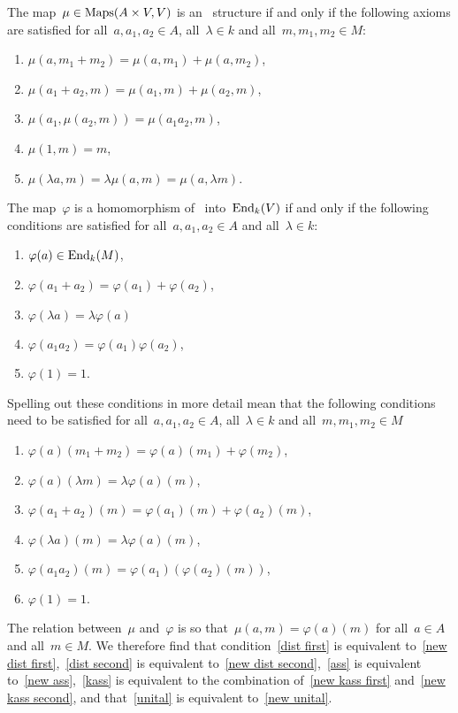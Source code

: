 The map~$\mu \in \operatorname{Maps}(A \times V, V)$ is an~{\Amod} structure if and only if the following axioms are satisfied for all~$a, a_1, a_2 \in A$, all~$\lambda \in k$ and all~$m, m_1, m_2 \in M$:
\begin{enumerate}[label=(MS\arabic*)]
  \item
    \label{dist second}
    $\mu(a,m_1 + m_2) = \mu(a,m_1) + \mu(a,m_2)$,
  \item
    \label{dist first}
    $\mu(a_1 + a_2,m) = \mu(a_1,m) + \mu(a_2,m)$,
  \item
    \label{ass}
    $\mu(a_1, \mu(a_2, m)) = \mu(a_1 a_2, m)$,
  \item
    \label{unital}
    $\mu(1,m) = m$,
  \item
    \label{kass}
    $\mu(\lambda a, m) = \lambda \mu(a,m) = \mu(a,\lambda m)$.
\end{enumerate}
The map~$\varphi$ is a homomorphism of~{\kalg} into~$\operatorname{End}_k(V)$ if and only if the following conditions are satisfied for all~$a, a_1, a_2 \in A$ and all~$\lambda \in k$:
\begin{enumerate}[label=(AH\arabic*)]
  \item
    $\varphi(a) \in \operatorname{End}_k(M)$,
  \item
    $\varphi(a_1 + a_2) = \varphi(a_1) + \varphi(a_2)$,
  \item
    $\varphi(\lambda a) = \lambda \varphi(a)$
  \item
    $\varphi(a_1 a_2) = \varphi(a_1) \varphi(a_2)$,
  \item
    $\varphi(1) = 1$.
\end{enumerate}
Spelling out these conditions in more detail mean that the following conditions need to be satisfied for all~$a, a_1, a_2 \in A$, all~$\lambda \in k$ and all~$m, m_1, m_2 \in M$
\begin{enumerate}[label=(AH\arabic**)]
  \item
    \label{new dist second}
    $\varphi(a)(m_1 + m_2) = \varphi(a)(m_1) + \varphi(m_2)$,
  \item
    \label{new kass first}
    $\varphi(a)(\lambda m) = \lambda \varphi(a)(m)$,
  \item
    \label{new dist first}
    $\varphi(a_1 + a_2)(m) = \varphi(a_1)(m) + \varphi(a_2)(m)$,
  \item
    \label{new kass second}
    $\varphi(\lambda a)(m) = \lambda \varphi(a)(m)$,
  \item
    \label{new ass}
    $\varphi(a_1 a_2)(m) = \varphi(a_1)(\varphi(a_2)(m))$,
  \item
    \label{new unital}
    $\varphi(1) = 1$.
\end{enumerate}
The relation between~$\mu$ and~$\varphi$ is so that~$\mu(a,m) = \varphi(a)(m)$ for all~$a \in A$ and all~$m \in M$.
We therefore find that condition~\ref{dist first} is equivalent to~\ref{new dist first},~\ref{dist second} is equivalent to~\ref{new dist second},~\ref{ass} is equivalent to~\ref{new ass},~\ref{kass} is equivalent to the combination of~\ref{new kass first} and~\ref{new kass second}, and that~\ref{unital} is equivalent to~\ref{new unital}.





